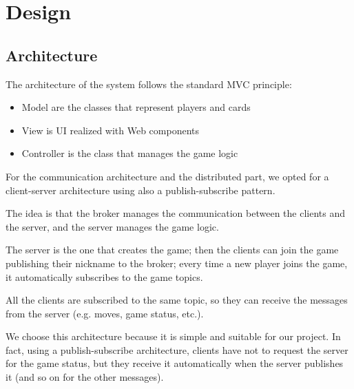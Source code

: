 \documentclass{scrartcl}
\begin{document}
\newpage
\section{Design}\label{design}

\subsection{Architecture}\label{architecture}
The architecture of the system follows the standard MVC principle:
\begin{itemize}
      \item Model are the classes that represent players and cards
      \item View is UI realized with Web components
      \item Controller is the class that manages the game logic
\end{itemize}
For the communication architecture and the distributed part, we opted for a client-server architecture
using also a publish-subscribe pattern.

The idea is that the broker manages the communication between the clients and the server, and the
server manages the game logic.

The server is the one that creates the game; then the clients can join the game publishing their
nickname to the broker; every time a new player joins the game, it automatically subscribes to the
game topics.

All the clients are subscribed to the same topic, so they can receive the messages from the server
(e.g. moves, game status, etc.).

We choose this architecture because it is simple and suitable for our project.
In fact, using a publish-subscribe architecture, clients have not to request the server for the game
status, but they receive it automatically when the server publishes it
(and so on for the other messages).
\end{document}

